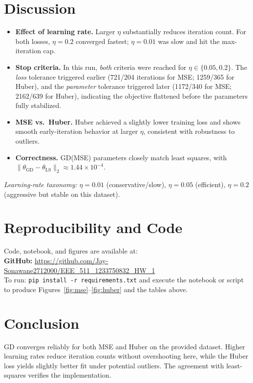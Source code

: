 \documentclass[11pt]{article}
\begin{document}
\section{Discussion}
\begin{itemize}[leftmargin=1.5em]
\item \textbf{Effect of learning rate.} Larger $\eta$ substantially reduces iteration count. For both losses, $\eta=0.2$ converged fastest; $\eta=0.01$ was slow and hit the max-iteration cap.
\item \textbf{Stop criteria.} In this run, \emph{both} criteria were reached for $\eta\in\{0.05,0.2\}$. The \emph{loss} tolerance triggered earlier (721/204 iterations for MSE; 1259/365 for Huber), and the \emph{parameter} tolerance triggered later (1172/340 for MSE; 2162/639 for Huber), indicating the objective flattened before the parameters fully stabilized.
\item \textbf{MSE vs.\ Huber.} Huber achieved a slightly lower training loss and shows smooth early-iteration behavior at larger $\eta$, consistent with robustness to outliers.
\item \textbf{Correctness.} GD(MSE) parameters closely match least squares, with $\|\theta_{\mathrm{GD}}-\theta_{\mathrm{LS}}\|_2\approx 1.44\times10^{-4}$.
\end{itemize}
\noindent \textit{Learning-rate taxonomy:} $\eta{=}0.01$ (conservative/slow), $\eta{=}0.05$ (efficient), $\eta{=}0.2$ (aggressive but stable on this dataset).

\section{Reproducibility and Code}
Code, notebook, and figures are available at:\\[2pt]
\textbf{GitHub:} \href{https://github.com/Jay-Sonawane2712000/EEE_511_1233750832_HW_1}{https://github.com/Jay-Sonawane2712000/EEE\_511\_1233750832\_HW\_1}\\[3pt]
To run: \texttt{pip install -r requirements.txt} and execute the notebook or script to produce Figures~\ref{fig:mse}--\ref{fig:huber} and the tables above.

\section*{Conclusion}
GD converges reliably for both MSE and Huber on the provided dataset. Higher learning rates reduce iteration counts without overshooting here, while the Huber loss yields slightly better fit under potential outliers. The agreement with least-squares verifies the implementation.
\end{document}
